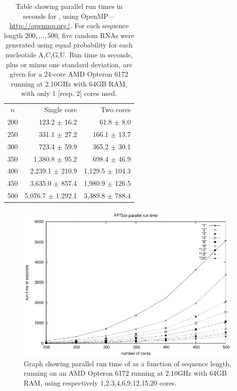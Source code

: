 \begin{table}[!ht]
\centering
\begin{tabularx}{\linewidth}{c *{2}{R}}
\toprule
\small{$n$} & \small{Single core} & \small{Two cores} \\
\cmidrule(lr){1-3}
200 & 123.2 $\pm$ 16.2 & 61.8 $\pm$ 8.0 \\
250 & 331.1 $\pm$ 27.2 & 166.1 $\pm$ 13.7 \\
300 & 723.4 $\pm$ 59.9 & 365.2 $\pm$ 30.1 \\
350 & 1,380.8 $\pm$ 95.2 & 698.4 $\pm$ 46.9 \\
400 & 2,239.1 $\pm$ 210.9 & 1,129.5 $\pm$ 104.3 \\
450 & 3,635.0 $\pm$ 857.4 & 1,980.9 $\pm$ 126.5 \\
500 & 5,076.7 $\pm$ 1,292.1 & 3,389.8 $\pm$ 788.4 \\
\bottomrule
\end{tabularx}
\caption[Table showing parallel run times in seconds
for \fftbor, using OpenMP]{Table showing parallel run times in seconds
for \fftbor, using OpenMP---\url{http://openmp.org/}.
For each sequence length $200,\dots,500$,
five random RNAs were generated using equal probability for each nucleotide
A,C,G,U. Run time in seconds, plus or minus one standard deviation, are
given for a 24-core
AMD Opteron 6172 running at 2.10GHz with 64GB RAM, with only 1 [resp. 2] cores
used.}
\label{table:fftborBenchmarkingParallel}
\end{table}

\begin{figure}[!ht]
\centering
\includegraphics[width=.75\textwidth]{Figures/FFTbor/fftborParallelRunTimes.pdf}
\caption[]{Graph showing parallel run time of \fftbor as a function of
sequence length, running on an AMD Opteron 6172 running at 2.10GHz with 64GB RAM,
using respectively 1,2,3,4,6,9,12,15,20 cores.
}
\label{fig:fftbor:benchmarkingParallel}
\end{figure}
